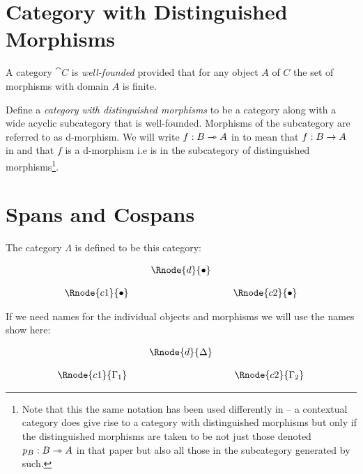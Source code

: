 \documentclass[10pt,a4paper]{article}
\begin{document}
\section{Category with Distinguished Morphisms}

\begin{definition}
\noindent A category $\cat{C}$ is \textit{well-founded} provided that for 
any object $A$ of $C$ the set of morphisms with domain $A$ is finite. 
\end{definition}
\begin{definition}
Define a \textit{category with distinguished morphisms} to be a category  along with a wide acyclic subcategory  that is well-founded. 
Morphisms of the subcategory are referred to as d-morphism. 
We will write $f:B \rightarrowtriangle A$ in 
to mean that 
$f: B \rightarrow A$ in  and that $f$ is a d-morphism i.e is in the subcategory  of distinguished morphisms\footnote{
Note that this the same notation has been used differently in \cite{Cartmell86} -- a contextual category does give rise to a category with distinguished morphisms but only
if the distinguished morphisms are taken to be not just those
denoted $p_B: B \rightarrowtriangle A$ in that paper
but also all those in  the subcategory generated by such.
}. 
\end{definition} 

\section{Spans and Cospans}
\noindent
The category $\Lambda$ is defined to be this category:
\begin{center}
\begin{displaymath}
\begin{array}{cp{0.1cm}cp{0.1cm} c}
            & &\Rnode{d}{\bullet}                  \\ [0.4cm]
\Rnode{c1}{\bullet}& &                & & \Rnode{c2}{\bullet} 
\end{array}
\end{displaymath}
\end{center}

\noindent
If we need names for the individual objects and morphisms we will use the names show here:
\begin{center}
\begin{displaymath}
\begin{array}{cp{0.1cm}cp{0.1cm} c}
            & &\Rnode{d}{\Delta}                  \\ [0.4cm]
\Rnode{c1}{\Gamma_1}& &                & & \Rnode{c2}{\Gamma_2} 
\end{array}
\end{displaymath}
\end{center}
\end{document}
